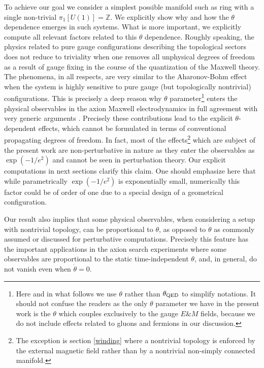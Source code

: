 \documentclass[ twocolumn,aps,prd,   
               preprintnumbers,numbers,sort&compress,nofootinbib,
                            showpacs,superscriptaddress,
               colorlinks,
               linkcolor=blue,   
               citecolor=blue]{revtex4-1}   \newcommand{\exclude}[1]{}
\begin{document}
   To achieve our  goal we consider a simplest possible  manifold such as ring with a single non-trivial    $\pi_1[U(1)]=\mathbb{Z}$.  We explicitly show why and how 
   the $\theta$ dependence emerges in such systems. What is more important, we explicitly compute all relevant factors related to this $\theta$ dependence. Roughly speaking, 
  the physics related to pure gauge configurations describing the topological sectors does not reduce to triviality when one removes all unphysical degrees of freedom as a result of gauge fixing in the course of the quantization of the Maxwell theory.
  The phenomena, in all respects, are very similar to the Aharonov-Bohm effect when the system is highly sensitive to pure gauge (but topologically nontrivial) configurations. 
  This is precisely a deep reason why   $\theta$ parameter\footnote{Here and in what follows we use $\theta$ rather than $\theta_{\rm QED}$ to simplify notations. It should not confuse the readers   as the only  $\theta$ parameter we have in the present work is the $\theta$ which couples exclusively to the gauge $E\&M$ fields, because we do not include effects related to gluons and fermions in our discussion.}  enters the physical observables in the axion Maxwell electrodynamics in full agreement with very generic arguments  \cite{Witten:1995gf,Verlinde:1995mz,Olive:2000yy}. Precisely these contributions   lead to the explicit $\theta$-dependent 
  effects, which cannot be formulated in terms of conventional propagating degrees of freedom. In fact, most of the  effects\footnote{The  exception is section \ref{winding} where a nontrivial topology is enforced by the external magnetic field rather than by a nontrivial non-simply connected manifold.}  which are subject of the present work are non-perturbative in nature as they enter the observables as $\exp(-1/e^2)$ and cannot be seen in perturbation theory. 
 Our explicit computations in next sections clarify  this claim. One should emphasize here that while parametrically $\exp(-1/e^2)$
 is exponentially small, numerically this factor could be of  order of one due to  a  special design of  a geometrical configuration. 
 
   
Our result also implies that some physical observables, when considering a setup with nontrivial topology, can be proportional to $\theta$, as opposed to $\dot{\theta}$ as commonly assumed or discussed for perturbative computations. Precisely this feature has the  important applications in the axion search experiments where some observables are proportional to the  static time-independent  $\theta $, and, in general,  do not vanish even when $\dot{\theta}=0$.  
  
\end{document}
